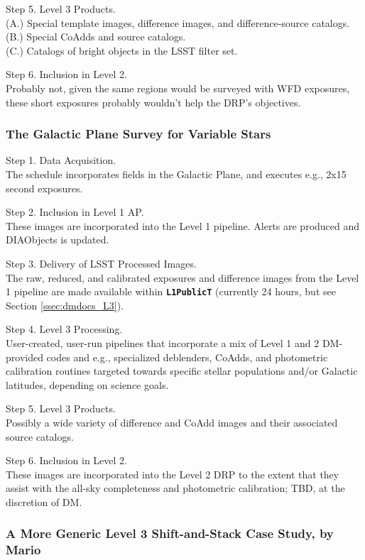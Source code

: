 \documentclass[DM,lsstdraft,toc]{lsstdoc}
\begin{document}
Step 5. Level 3 Products. \\ 
(A.) Special template images, difference images, and difference-source catalogs. \\
(B.) Special CoAdds and source catalogs. \\
(C.) Catalogs of bright objects in the LSST filter set. 

Step 6. Inclusion in Level 2. \\ Probably not, given the same regions would be surveyed with WFD exposures, these short exposures probably wouldn't help the DRP's objectives. 


\subsubsection{The Galactic Plane Survey for Variable Stars}

Step 1. Data Acquisition. \\ The schedule incorporates fields in the Galactic Plane, and executes e.g., 2x15 second exposures.

Step 2. Inclusion in Level 1 AP. \\ These images are incorporated into the Level 1 pipeline. Alerts are produced and DIAObjects is updated.

Step 3. Delivery of LSST Processed Images. \\ The raw, reduced, and calibrated exposures and difference images from the Level 1 pipeline are made available within {\tt \textbf{L1PublicT}} (currently 24 hours, but see Section \ref{ssec:dmdocs_L3}).

Step 4. Level 3 Processing. \\ User-created, user-run pipelines that incorporate a mix of Level 1 and 2 DM-provided codes and e.g., specialized deblenders, CoAdds, and photometric calibration routines targeted towards specific stellar populations and/or Galactic latitudes, depending on science goals. 

Step 5. Level 3 Products. \\ Possibly a wide variety of difference and CoAdd images and their associated source catalogs.

Step 6. Inclusion in Level 2. \\ These images are incorporated into the Level 2 DRP to the extent that they assist with the all-sky completeness and photometric calibration; TBD, at the discretion of DM.


\subsubsection{A More Generic Level 3 Shift-and-Stack Case Study, by Mario}\label{sssec:science_dmsums_generic}
\end{document}
